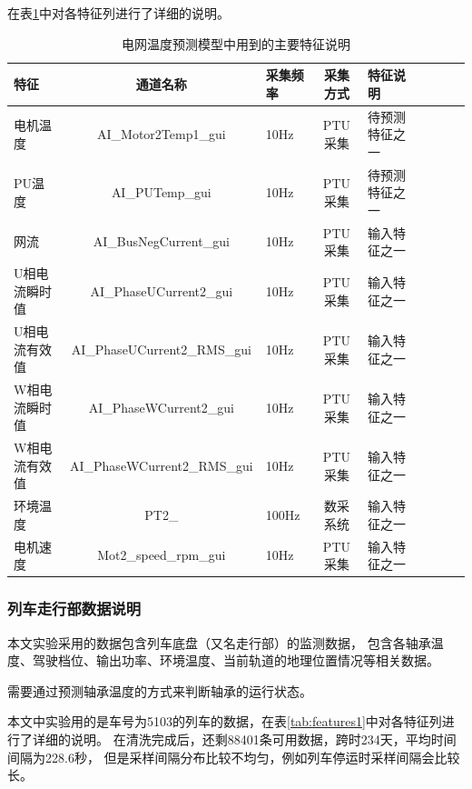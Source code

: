    在表\ref{tab:features2}中对各特征列进行了详细的说明。
    \begin{table}
        \centering
        \caption{电网温度预测模型中用到的主要特征说明}
        \begin{tabular}{lclclclcl}
          \toprule
          特征    & 通道名称 &采集频率&采集方式 &特征说明                                       \\
          \midrule
          电机温度   & AI\_Motor2Temp1\_gui &10Hz &PTU采集 & 待预测特征之一\\
          PU温度   & AI\_PUTemp\_gui &10Hz &PTU采集 & 待预测特征之一\\
          网流   & AI\_BusNegCurrent\_gui &10Hz &PTU采集 & 输入特征之一\\
          U相电流瞬时值   & AI\_PhaseUCurrent2\_gui &10Hz &PTU采集 & 输入特征之一\\
          U相电流有效值   & AI\_PhaseUCurrent2\_RMS\_gui &10Hz &PTU采集 & 输入特征之一\\
          W相电流瞬时值   & AI\_PhaseWCurrent2\_gui &10Hz &PTU采集 & 输入特征之一\\
          W相电流有效值   & AI\_PhaseWCurrent2\_RMS\_gui &10Hz &PTU采集 & 输入特征之一\\
          环境温度   & PT2\_ &100Hz &数采系统 & 输入特征之一\\
          电机速度   & Mot2\_speed\_rpm\_gui &10Hz &PTU采集 & 输入特征之一\\
          
          \bottomrule
        \end{tabular}
        \label{tab:features2}
      \end{table}
  \subsubsection{列车走行部数据说明}
    本文实验采用的数据包含列车底盘（又名走行部）的监测数据，
    包含各轴承温度、驾驶档位、输出功率、环境温度、当前轨道的地理位置情况等相关数据。

    需要通过预测轴承温度的方式来判断轴承的运行状态。

    本文中实验用的是车号为5103的列车的数据，在表\ref{tab:features1}中对各特征列进行了详细的说明。
    在清洗完成后，还剩88401条可用数据，跨时234天，平均时间间隔为228.6秒，
    但是采样间隔分布比较不均匀，例如列车停运时采样间隔会比较长。

